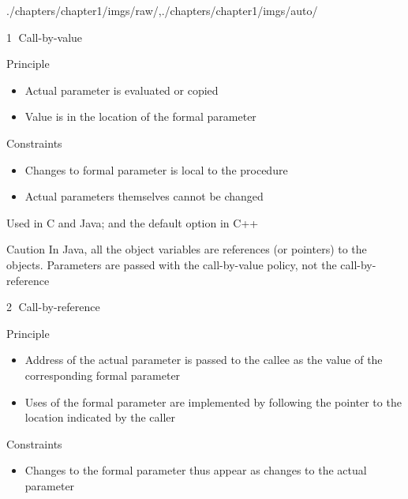 \begin{graphicspathcontext}{{./chapters/chapter1/imgs/raw/},{./chapters/chapter1/imgs/auto/}}
\begin{bibunit}[apalike]
\begin{frame}[t]{\textcircled{1} Call-by-value}
	\begin{block}{Principle}
		\begin{itemize}
		\item Actual parameter is evaluated or copied
		\item Value is in the location of the formal parameter
		\end{itemize}
	\end{block}
	\begin{block}{Constraints}
		\begin{itemize}
			\item Changes to formal parameter is local to the procedure
			\item Actual parameters themselves cannot be changed
		\end{itemize}
	\end{block}
	\begin{example}
		Used in C and Java; and the default option in C++
	\end{example}
	\begin{alertblock}{Caution}
		In Java, all the object variables are references (or pointers) to the objects. Parameters are passed with the call-by-value policy, not the call-by-reference
	\end{alertblock}
\end{frame}

\begin{frame}{\textcircled{2} Call-by-reference}
	\begin{block}{Principle}
		\begin{itemize}
			\item Address of the actual parameter is passed to the callee as the value of the corresponding formal parameter
			\item Uses of the formal parameter are implemented by following the pointer to the location indicated by the caller
		\end{itemize}
	\end{block}
	\begin{block}{Constraints}
		\begin{itemize}
			\item Changes to the formal parameter thus appear as changes to the actual parameter
		\end{itemize}
	\end{block}
\end{frame}


\end{bibunit}
\end{graphicspathcontext}
